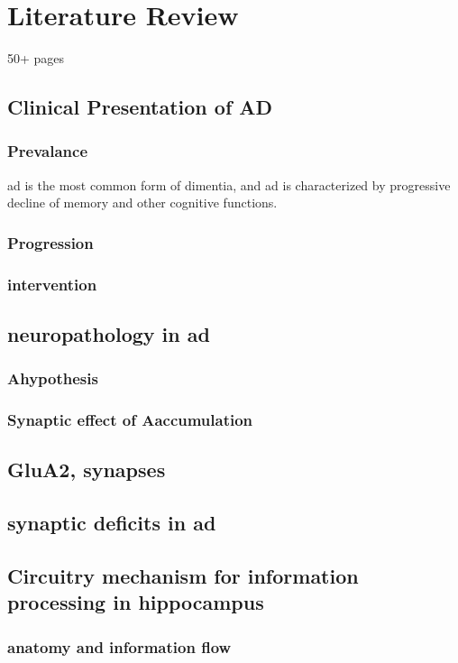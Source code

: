 \chapter{Literature Review}
50+ pages



\section{Clinical Presentation of \gls{AD}}
\subsection{Prevalance}
\gls{ad} is the most common form of dimentia, and 
\gls{ad} is characterized by progressive decline of memory and other cognitive functions.
\subsection{Progression}
\subsection{intervention}

\section{neuropathology in \gls{ad}}
\subsection{A\textbeta hypothesis}
\subsection{Synaptic effect of A\textbeta accumulation}

\section{GluA2, synapses}

\section{synaptic deficits in \gls{ad}}

\section{Circuitry mechanism for information processing in hippocampus}
\subsection{anatomy and information flow}
